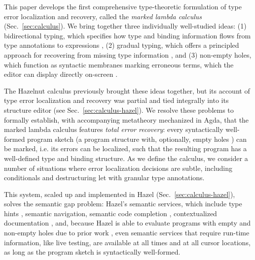 This paper develops the first comprehensive {type-theoretic formulation} of type error localization and recovery, called the \emph{marked lambda calculus} (Sec.~\ref{sec:calculus}).
We bring together three individually well-studied ideas: (1) bidirectional typing, which specifies how type and binding information flows from 
type annotations to expressions \cite{pierce,BidirTyping}, (2) gradual typing, which offers a principled approach for recovering from missing type information  \cite{GradualTyping,sieksnapl}, and 
(3) non-empty holes, which function as syntactic membranes marking erroneous terms, which the editor can display directly on-screen \cite{HazelnutPOPL}.

The Hazelnut calculus \cite{HazelnutPOPL} previously brought these ideas together, but its account of type error localization and recovery was partial and tied integrally into its structure editor (see Sec.~\ref{sec:calculus-hazel}). 
We resolve these problems to formally establish, with accompanying metatheory mechanized in Agda, that the marked lambda calculus features \emph{total error recovery}: {every} syntactically well-formed program sketch (a program structure with, optionally, empty holes \cite{sketching}) can be marked, i.e. its errors can be localized, such that the resulting program has a well-defined type and binding structure.
As we define the calculus, we consider a number of situations where error localization decisions are subtle, including conditionals and destructuring let with granular type annotations.

This system, scaled up and implemented in Hazel (Sec.~\ref{sec:calculus-hazel}), solves the semantic gap problem: Hazel's semantic services, which include type hints \cite{potter1}, semantic navigation, semantic code completion \cite{potter1,blinn}, contextualized documentation \cite{potter2}, and, because Hazel is able to evaluate programs with empty and non-empty holes due to prior work \cite{HazelnutLive}, even semantic services that require run-time information, like live testing, 
are available at all times and at all cursor locations, as long as the program sketch is syntactically well-formed.

